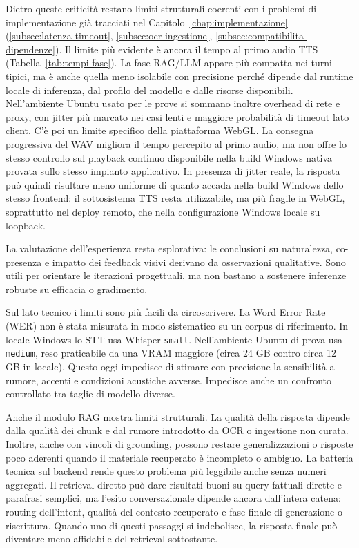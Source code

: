 Dietro queste criticità restano limiti strutturali coerenti con i problemi di implementazione già tracciati nel Capitolo~\ref{chap:implementazione} (\autoref{subsec:latenza-timeout}, \autoref{subsec:ocr-ingestione}, \autoref{subsec:compatibilita-dipendenze}). Il limite più evidente è ancora il tempo al primo audio TTS (Tabella~\ref{tab:tempi-fase}). La fase RAG/LLM appare più compatta nei turni tipici, ma è anche quella meno isolabile con precisione perché dipende dal runtime locale di inferenza, dal profilo del modello e dalle risorse disponibili. Nell'ambiente Ubuntu usato per le prove si sommano inoltre overhead di rete e proxy, con jitter più marcato nei casi lenti e maggiore probabilità di timeout lato client. C'è poi un limite specifico della piattaforma WebGL. La consegna progressiva del WAV migliora il tempo percepito al primo audio, ma non offre lo stesso controllo sul playback continuo disponibile nella build Windows nativa provata sullo stesso impianto applicativo. In presenza di jitter reale, la risposta può quindi risultare meno uniforme di quanto accada nella build Windows dello stesso frontend: il sottosistema TTS resta utilizzabile, ma più fragile in WebGL, soprattutto nel deploy remoto, che nella configurazione Windows locale su loopback.

La valutazione dell'esperienza resta esplorativa: le conclusioni su naturalezza, co-presenza e impatto dei feedback visivi derivano da osservazioni qualitative. Sono utili per orientare le iterazioni progettuali, ma non bastano a sostenere inferenze robuste su efficacia o gradimento.\cite{seaborn2021voiceux}

Sul lato tecnico i limiti sono più facili da circoscrivere. La Word Error Rate (WER) non è stata misurata in modo sistematico su un corpus di riferimento. In locale Windows lo STT usa Whisper \texttt{small}. Nell'ambiente Ubuntu di prova usa \texttt{medium}, reso praticabile da una VRAM maggiore (circa 24 GB contro circa 12 GB in locale). Questo oggi impedisce di stimare con precisione la sensibilità a rumore, accenti e condizioni acustiche avverse. Impedisce anche un confronto controllato tra taglie di modello diverse.\cite{Radford2023Whisper}

Anche il modulo RAG mostra limiti strutturali. La qualità della risposta dipende dalla qualità dei chunk e dal rumore introdotto da OCR o ingestione non curata. Inoltre, anche con vincoli di grounding, possono restare generalizzazioni o risposte poco aderenti quando il materiale recuperato è incompleto o ambiguo.\cite{gao2024ragsurvey} La batteria tecnica sul backend rende questo problema più leggibile anche senza numeri aggregati. Il retrieval diretto può dare risultati buoni su query fattuali dirette e parafrasi semplici, ma l'esito conversazionale dipende ancora dall'intera catena: routing dell'intent, qualità del contesto recuperato e fase finale di generazione o riscrittura. Quando uno di questi passaggi si indebolisce, la risposta finale può diventare meno affidabile del retrieval sottostante.

